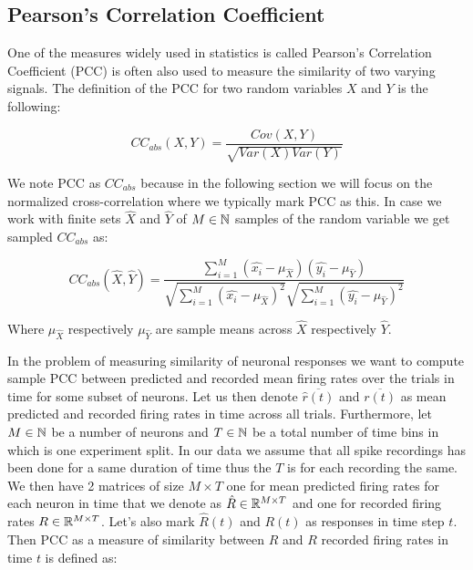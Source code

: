 \subsection{Pearson's Correlation Coefficient}
\label{subsec:pearson_cc}
One of the measures widely used in statistics is called Pearson's Correlation Coefficient (PCC) is often also used to measure the similarity of two varying signals. The definition of the PCC for two random variables $X$ and $Y$ is the following:

\begin{equation}
    CC_{abs}(X, Y) = \frac{Cov(X,Y)}{\sqrt{Var(X)Var(Y)}}
\end{equation}
\label{eq:pearson_general}

We note PCC as $CC_{abs}$ because in the following section we will focus on the normalized cross-correlation where we typically mark PCC as this. In case we work with finite sets $\hat{X}$ and $\hat{Y}$ of $M \in \mathbb{N}$ samples of the random variable we get sampled $CC_{abs}$ as:

\begin{equation}
    CC_{abs}(\hat{X}, \hat{Y}) 
    = \frac{\sum_{i=1}^{M}(\hat{x_i} - \mu_{\hat{X}})(\hat{y_i} - \mu_{\hat{Y}})}
    {\sqrt{\sum_{i=1}^{M}(\hat{x_i} - \mu_{\hat{X}})^{2}}
    \sqrt{\sum_{i=1}^{M}(\hat{y_i} - \mu_{\hat{Y}})^{2}}}
\end{equation}
\label{eq:pearson_sampled}

Where $\mu_{\hat{X}}$ respectively $\mu_{\hat{Y}}$ are sample means across $\hat{X}$ respectively $\hat{Y}$.

In the problem of measuring similarity of neuronal responses we want to compute sample PCC between predicted and recorded mean firing rates over the trials in time for some subset of neurons. Let us then denote $\overline{\hat{r}(t)}$ and $\overline{r(t)}$ as mean predicted and recorded firing rates in time across all trials. Furthermore, let $M \in \mathbb{N}$ be a number of neurons and $T \in \mathbb{N}$ be a total number of time bins in which is one experiment split. In our data we assume that all spike recordings has been done for a same duration of time thus the $T$ is for each recording the same. We then have 2 matrices of size $M \times T$ one for mean predicted firing rates for each neuron in time that we denote as $\hat{R} \in \mathbb{R}^{M \times T}$ and one for recorded firing rates $R \in \mathbb{R}^{M \times T}$. Let's also mark $\hat{R}(t)$ and $R(t)$ as responses in time step $t$. Then PCC as a measure of similarity between $\hat{R}$ and $R$ recorded firing rates in time $t$ is defined as:

